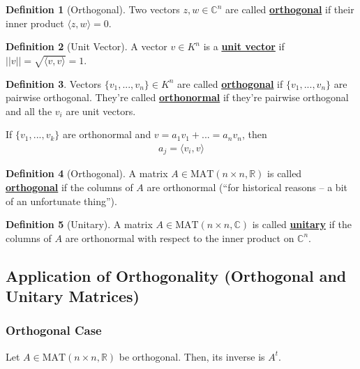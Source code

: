 \documentclass[11pt]{scrartcl}
\theoremstyle{definition}
\newtheorem{definition}{Definition}
\theoremstyle{remark}
\newcommand{\dfn}[1]{\textbf{\underline{#1}}}
\newcommand{\C}[0]{\mathbb{C}}
\newcommand{\matn}[1]{\text{MAT}(n\times n, \mathbb{#1})}
\begin{document}
\begin{definition}[Orthogonal]
	Two vectors $z, w \in \C^n$ are called \dfn{orthogonal} if their inner product $\langle z, w \rangle = 0$. 
\end{definition}

\begin{definition}[Unit Vector]
	A vector $v \in K^n$ is a \dfn{unit vector} if $|| v || = \sqrt{\langle v, v \rangle} = 1$. 
\end{definition}

\begin{definition}
	Vectors $\{ v_1, ..., v_n \} \in K^n$ are called \dfn{orthogonal} if $\{ v_1, ..., v_n \}$ are pairwise orthogonal. They're called \dfn{orthonormal} if they're pairwise orthogonal and all the $v_i$ are unit vectors. 
\end{definition}
If $\{ v_1, ..., v_k \}$ are orthonormal and $v = a_1 v_1 + ... = a_n v_n$, then 
\begin{align}
	a_j = \langle v_i, v \rangle 	
\end{align}

\begin{definition}[Orthogonal]
	A matrix $A \in \matn{R}$ is called \dfn{orthogonal} if the columns of $A$ are orthonormal (``for historical reasons -- a bit of an unfortunate thing''). 
\end{definition}

\begin{definition}[Unitary]
	A matrix $A \in \matn{C}$ is called \dfn{unitary} if the columns of $A$ are orthonormal with respect to the inner product on $\C^n$. 
\end{definition}

\subsection{Application of Orthogonality (Orthogonal and Unitary Matrices)}
\subsubsection{Orthogonal Case}
Let $A \in \matn{R}$ be orthogonal. Then, its inverse is $A^t$. 
\end{document}
